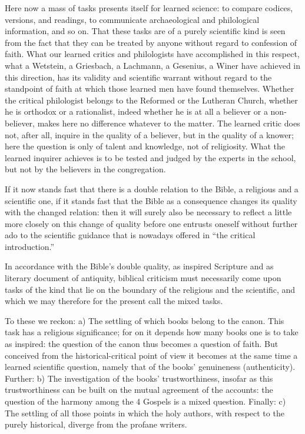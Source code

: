 \documentclass[12pt,a4paper]{book}
\begin{document}
Here now a mass of tasks presents itself for learned science: to compare codices,
versions, and readings, to communicate archaeological and philological
information, and so on. That these
tasks are of a purely scientific kind is seen from the fact that they can be
treated by anyone without regard to confession of faith. What our learned critics
and philologists have accomplished in this respect, what a Wetstein, a Griesbach,
a Lachmann, a Gesenius, a Winer have achieved in this direction, has its validity
and scientific warrant without regard to the standpoint of faith at which those
learned men have found themselves. Whether the critical philologist belongs to the
Reformed or the Lutheran Church, whether he is orthodox or a rationalist, indeed
whether he is at all a believer or a non-believer, makes here no difference
whatever to the matter. The learned critic does not, after all, inquire in the
quality of a believer, but in the quality of a knower; here the question is only
of talent and knowledge, not of religiosity. What the learned inquirer achieves is
to be tested and judged by the experts in the school, but not by the believers in
the congregation.

If it now stands fast that there is a double relation to the Bible, a religious
and a scientific one, if it stands fast that the Bible as a consequence changes
its quality with the changed relation: then it will surely also be necessary to
reflect a little more closely on this change of quality before one entrusts
oneself without further ado to the scientific guidance that is nowadays offered in
``the critical introduction.''

In accordance with the Bible's double quality, as inspired Scripture and as
literary document of antiquity, biblical criticism must necessarily come upon
tasks of the kind that lie on the boundary of the religious and the scientific,
and which we may therefore for the present call the mixed tasks.

To these we reckon: a) The settling of which books belong to the canon. This task
has a religious significance; for on it depends how many books one is to take as
inspired: the question of the canon thus becomes a question of faith. But
conceived from the historical-critical point of view
it becomes at the same time a learned scientific question, namely that of the
books' genuineness (authenticity). Further: b) The investigation of the books'
trustworthiness, insofar as this trustworthiness can be built on the mutual
agreement of the accounts: the question of the harmony among the 4 Gospels is a
mixed question. Finally: c) The settling of all those points in which the holy
authors, with respect to the purely historical, diverge from the profane writers.
\end{document}
